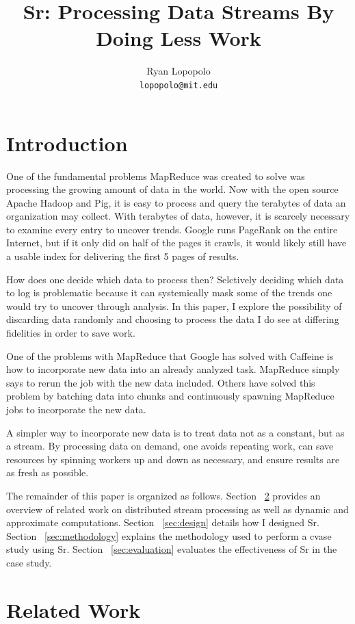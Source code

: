 \documentclass[12pt]{article}
\title{Sr: Processing Data Streams By Doing Less Work}
\author{Ryan Lopopolo\\
\texttt{lopopolo@mit.edu}}
\begin{document}
\twocolumn
\maketitle

\section{Introduction}
\label{sec:intro}
One of the fundamental problems MapReduce was created to solve was processing the growing amount of data in the world. Now with the open source Apache Hadoop and Pig, it is easy to process and query the terabytes of data an organization may collect. With terabytes of data, however, it is scarcely necessary to examine every entry to uncover trends. Google runs PageRank on the entire Internet, but if it only did on half of the pages it crawls, it would likely still have a usable index for delivering the first 5 pages of results.

How does one decide which data to process then? Selctively deciding which data to log is problematic because it can systemically mask some of the trends one would try to uncover through analysis. In this paper, I explore the possibility of discarding data randomly and choosing to process the data I do see at differing fidelities in order to save work.

One of the problems with MapReduce that Google has solved with Caffeine is how to incorporate new data into an already analyzed task. MapReduce simply says to rerun the job with the new data included. Others have solved this problem by batching data into chunks and continuously spawning MapReduce jobs to incorporate the new data.

A simpler way to incorporate new data is to treat data not as a constant, but as a stream. By processing data on demand, one avoids repeating work, can save resources by spinning workers up and down as necessary, and ensure results are as fresh as possible.

The remainder of this paper is organized as follows. Section ~\ref{sec:relwork} provides an overview of related work on distributed stream processing as well as dynamic and approximate computations. Section ~\ref{sec:design} details how I designed Sr. Section ~\ref{sec:methodology} explains the methodology used to perform a cvase study using Sr. Section ~\ref{sec:evaluation} evaluates the effectiveness of Sr in the case study.

\section{Related Work}
\label{sec:relwork}
\end{document}

